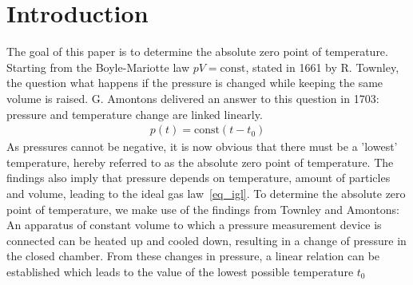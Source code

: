\section{Introduction}
    The goal of this paper is to determine the absolute zero point of temperature.
    Starting from the Boyle-Mariotte law $pV = \text{const}$, stated in 1661 by R. Townley, the question what happens if the pressure is changed while keeping the same volume is raised.
    G. Amontons delivered an answer to this question in 1703: pressure and temperature change are linked linearly.
    \begin{align}
        p(t) = \text{const} (t - t_0)
    \end{align}
    As pressures cannot be negative, it is now obvious that there must be a 'lowest' temperature, hereby referred to as the absolute zero point of temperature. 
    The findings also imply that pressure depends on temperature, amount of particles and volume, leading to the ideal gas law~\ref{eq_igl}.
    To determine the absolute zero point of temperature, we make use of the findings from Townley and Amontons:
    An apparatus of constant volume to which a pressure measurement device is connected can be heated up and cooled down, resulting in a change of pressure in the closed chamber.
    From these changes in pressure, a linear relation can be established which leads to the value of the lowest possible temperature $t_0$

